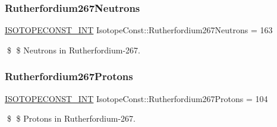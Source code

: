 \subsubsection{\texorpdfstring{Rutherfordium267\+Neutrons}{Rutherfordium267Neutrons}}
{\footnotesize\ttfamily \mbox{\hyperlink{group___isotope_const-_macros_ga5f18360b3e99483a35c32d789e62621c}{I\+S\+O\+T\+O\+P\+E\+C\+O\+N\+S\+T\+\_\+\+I\+NT}} Isotope\+Const\+::\+Rutherfordium267\+Neutrons = 163}

\$ \$ Neutrons in Rutherfordium-\/267. \mbox{\label{group___isotope_const-_rutherfordium-_rf267_ga05074e8293d793b987bfc74b4015ac0e}} 
\subsubsection{\texorpdfstring{Rutherfordium267\+Protons}{Rutherfordium267Protons}}
{\footnotesize\ttfamily \mbox{\hyperlink{group___isotope_const-_macros_ga5f18360b3e99483a35c32d789e62621c}{I\+S\+O\+T\+O\+P\+E\+C\+O\+N\+S\+T\+\_\+\+I\+NT}} Isotope\+Const\+::\+Rutherfordium267\+Protons = 104}

\$ \$ Protons in Rutherfordium-\/267. 